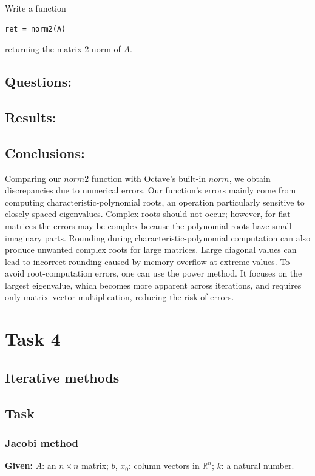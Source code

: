 \documentclass[a4paper, 11pt]{article}
\begin{document}
Write a function
\begin{center}
\begin{verbatim}
ret = norm2(A)
\end{verbatim}
\end{center}
returning the matrix 2-norm of \( A \).
\subsection{Questions:} 

\subsection{Results:} 

\subsection{Conclusions:}
Comparing our $norm2$ function with Octave's built-in $norm$, we obtain discrepancies due to numerical errors. Our function's errors mainly come from computing characteristic-polynomial roots, an operation particularly sensitive to closely spaced eigenvalues. Complex roots should not occur; however, for flat matrices the errors may be complex because the polynomial roots have small imaginary parts. Rounding during characteristic-polynomial computation can also produce unwanted complex roots for large matrices. Large diagonal values can lead to incorrect rounding caused by memory overflow at extreme values. To avoid root-computation errors, one can use the power method. It focuses on the largest eigenvalue, which becomes more apparent across iterations, and requires only matrix--vector multiplication, reducing the risk of errors.




\section{Task 4}
\subsection{Iterative methods}
\subsection{Task}

\subsubsection{Jacobi method}
\noindent \textbf{Given:} \( A \): an \( n \times n \) matrix; \( b \), \( x_0 \): column vectors in \( \mathbb{R}^n \); \( k \): a natural number.
\end{document}
